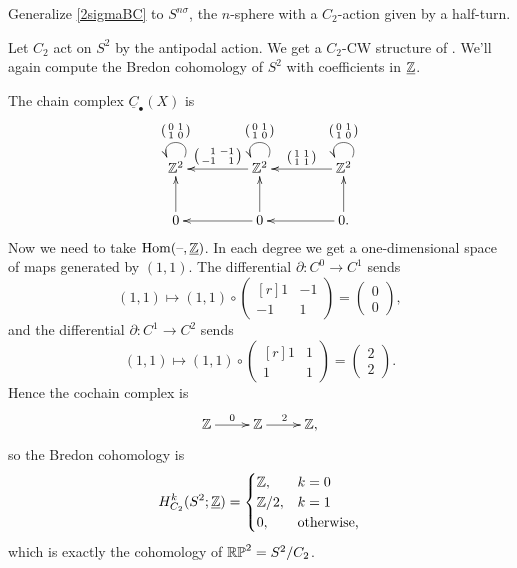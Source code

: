 \begin{ex}
Generalize \cref{2sigmaBC} to $S^{n\sigma}$, the $n$-sphere with a $C_2$-action given by a half-turn.
\end{ex}
\begin{exm}
Let $C_2$ act on $S^2$ by the antipodal action. We get a $C_2$-CW structure of \TODO. We'll again compute the
Bredon cohomology of $S^2$ with coefficients in $\underline{\mathbb Z}$.

The chain complex $\underline C_\bullet(X)$ is
\[\xymatrix@C=1.5cm{
	\Z^2\ar@(ur,ul)_{\begin{psmallmatrix}0&1\\1&0\end{psmallmatrix}} &
	\Z^2\ar[l]_{\begin{psmallmatrix*}[r]1&-1\\-1&1\end{psmallmatrix*}}
	\ar@(ur,ul)_{\begin{psmallmatrix}0&1\\1&0\end{psmallmatrix}} &
	\Z^2\ar[l]_{\begin{psmallmatrix}1&1\\1&1\end{psmallmatrix}}
	\ar@(ur,ul)_{\begin{psmallmatrix}0&1\\1&0\end{psmallmatrix}}\\
	0\ar[u] & 0\ar[u]\ar[l] & 0.\ar[u]\ar[l]
}\]
Now we need to take $\operatorname{Hom}(\text{--},\underline{\mathbb Z})$. In each degree we get a one-dimensional space of maps generated by
$(1,1)$. The differential $\partial\colon C^0\to C^1$ sends
\[(1,1)\mapsto (1,1)\circ\begin{pmatrix*}[r]1 & -1\\-1 & 1\end{pmatrix*} = \begin{pmatrix}0\\0\end{pmatrix},\]
and the differential $\partial\colon C^1\to C^2$ sends
\[(1,1)\mapsto (1,1)\circ\begin{pmatrix*}[r]1 & 1\\1 & 1\end{pmatrix*} = \begin{pmatrix}2\\2\end{pmatrix}.\]
Hence the cochain complex is
\[\xymatrix{
	\Z\ar[r]^0 & \Z\ar[r]^2 & \Z,
}\]
so the Bredon cohomology is
\[H_{C_2}^k(S^2;\underline{\mathbb Z}) = \begin{cases}
	\mathbb Z, &k = 0\\
	\mathbb Z/2, &k = 1\\
	0, &\text{otherwise,}
\end{cases}\]
which is exactly the cohomology of $\mathbb{RP}^2 = S^2/C_2$.
\end{exm}
